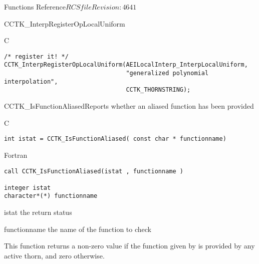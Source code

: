 \begin{cactuspart}{ Functions Reference}{$RCSfile$}{$Revision: 4641 $}
\begin{FunctionDescription}{CCTK\_InterpRegisterOpLocalUniform}
\begin{ExampleSection}
\begin{Example}{C}
\begin{verbatim}
/* register it! */
CCTK_InterpRegisterOpLocalUniform(AEILocalInterp_InterpLocalUniform,
                                  "generalized polynomial interpolation",
                                  CCTK_THORNSTRING);
\end{verbatim}
\end{Example}
\end{ExampleSection}
\end{FunctionDescription}


\begin{FunctionDescription}{CCTK\_IsFunctionAliased}{Reports whether an aliased function has been provided}
\label{CCTK-IsFunctionAliased}
\begin{SynopsisSection}
\begin{Synopsis}{C}
\begin{verbatim}int istat = CCTK_IsFunctionAliased( const char * functionname)\end{verbatim}
\end{Synopsis}
\begin{Synopsis}{Fortran}
\begin{verbatim}call CCTK_IsFunctionAliased(istat , functionname )

integer istat
character*(*) functionname\end{verbatim}
\end{Synopsis}
\end{SynopsisSection}
\begin{ParameterSection}
\begin{Parameter}{istat}
the return status
\end{Parameter}
\begin{Parameter}{functionname}
the name of the function to check
\end{Parameter}
\end{ParameterSection}
\begin{Discussion}
This function returns a non-zero value if the function given by
 is provided by any active thorn, and zero
otherwise.
\end{Discussion}
\end{FunctionDescription}


\end{cactuspart}
